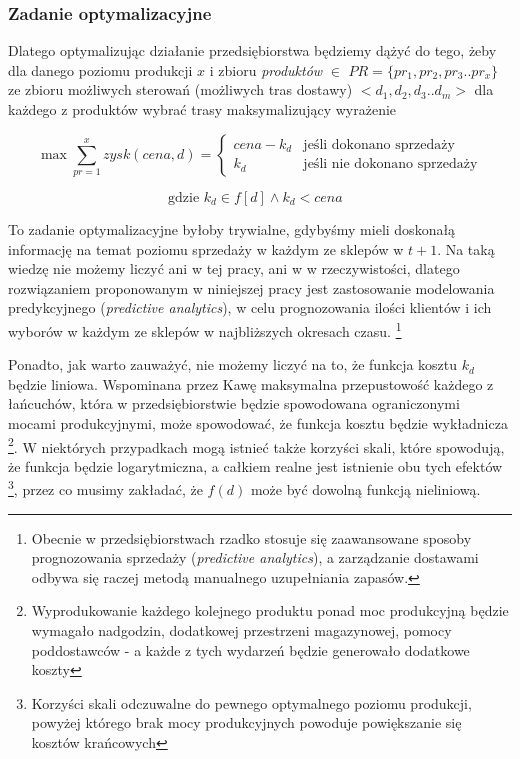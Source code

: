 \documentclass{article}
\begin{document}
\subsubsection{Zadanie optymalizacyjne} 
Dlatego optymalizując działanie przedsiębiorstwa będziemy dążyć do tego, żeby dla danego poziomu produkcji $x$ i zbioru \textit{produktów} $\in$ $PR = \{pr_1,pr_2,pr_3..pr_x\} $ ze zbioru możliwych sterowań (możliwych tras dostawy) $<d_1,d_2,d_3..d_m>$ dla każdego z produktów wybrać trasy maksymalizujący wyrażenie

\begin{equation} \label{eq:teoria1}
\max \sum\limits_{pr=1}^x  zysk (cena,d) = \begin{cases}
cena - k_d &\text{jeśli dokonano sprzedaży}\\
k_d &\text{jeśli nie dokonano sprzedaży}
\end{cases}
\end{equation}

\begin{equation*}
 \text{gdzie $k_d \in f[d] \wedge k_d < cena $ }
\end{equation*}

To zadanie optymalizacyjne byłoby trywialne, gdybyśmy mieli doskonałą informację na temat poziomu sprzedaży w każdym ze sklepów w $ t + 1 $. Na taką wiedzę nie możemy liczyć ani w tej pracy, ani w w rzeczywistości, dlatego rozwiązaniem proponowanym w niniejszej pracy jest zastosowanie modelowania predykcyjnego (\textit{predictive analytics}), w celu prognozowania ilości klientów i ich wyborów w każdym ze sklepów w najbliższych okresach czasu. \footnote{Obecnie w przedsiębiorstwach rzadko stosuje się zaawansowane sposoby prognozowania sprzedaży (\textit{predictive analytics}), a zarządzanie dostawami odbywa się raczej metodą manualnego uzupełniania zapasów.} 

Ponadto, jak warto zauważyć, nie możemy liczyć na to, że funkcja kosztu $k_d$ będzie liniowa. Wspominana przez Kawę maksymalna przepustowość każdego z łańcuchów, która w przedsiębiorstwie będzie spowodowana ograniczonymi mocami produkcyjnymi, może spowodować, że funkcja kosztu będzie wykładnicza \footnote{Wyprodukowanie każdego kolejnego produktu ponad moc produkcyjną będzie wymagało nadgodzin, dodatkowej przestrzeni magazynowej, pomocy poddostawców - a każde z tych wydarzeń będzie generowało dodatkowe koszty}. W niektórych przypadkach mogą istnieć także korzyści skali, które spowodują, że funkcja będzie logarytmiczna, a całkiem realne jest istnienie obu tych efektów  \footnote{Korzyści skali odczuwalne do pewnego optymalnego poziomu produkcji, powyżej którego brak mocy produkcyjnych powoduje  powiększanie się kosztów krańcowych}, przez co musimy zakładać, że $f(d)$ może być dowolną funkcją nieliniową.
\end{document}
